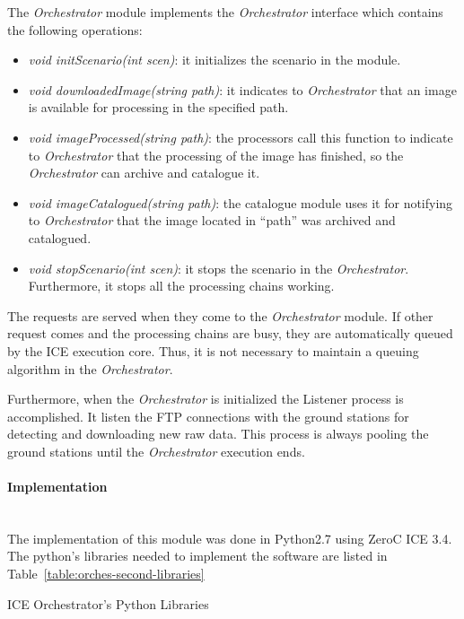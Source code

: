 The \emph{Orchestrator} module implements the \emph{Orchestrator} interface
which contains the following operations:
\begin{itemize}
\item \emph{void initScenario(int scen)}: it initializes the scenario in the
  module.
\item \emph{void downloadedImage(string path)}: it indicates to
  \emph{Orchestrator} that an image is available for processing in the specified
  path.
\item \emph{void imageProcessed(string path)}: the processors call this function
  to indicate to \emph{Orchestrator} that the processing of the image has
  finished, so the \emph{Orchestrator} can archive and catalogue it.
\item \emph{void imageCatalogued(string path)}: the catalogue module uses it for
  notifying to \emph{Orchestrator} that the image located in ``path'' was
  archived and catalogued.
\item \emph{void stopScenario(int scen)}: it stops the scenario in the
  \emph{Orchestrator}. Furthermore, it stops all the processing chains working.
\end{itemize}

The requests are served when they come to the \emph{Orchestrator} module. If
other request comes and the processing chains are busy, they are automatically queued by the
ICE execution core. Thus, it is not necessary to maintain a queuing algorithm in
the \emph{Orchestrator}.

Furthermore, when the \emph{Orchestrator} is initialized the Listener process is
accomplished. It listen the \ac{FTP} connections with the ground stations for
detecting and downloading new raw data. This process is always pooling the
ground stations until the \emph{Orchestrator} execution ends.

\paragraph{Implementation}~\\

The implementation of this module was done in Python2.7 using ZeroC ICE 3.4. The
python's libraries needed to implement the software are listed in
Table~\ref{table:orches-second-libraries}

\begin{table}[hp]
  \centering
  {\small
  
  }
  \caption{ICE Orchestrator’s Python Libraries}
  \label{table:orches-second-libraries}
\end{table}

